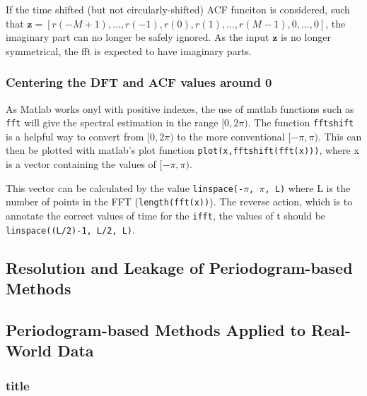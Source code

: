 \documentclass[main.tex]{subfiles}
\begin{document}
If the time shifted (but not circularly-shifted) ACF funciton is considered, such that $\textbf{z}=[r(-M+1),...,r(-1),r(0),r(1),...,r(M-1),0,...,0]$, the imaginary part can no longer be safely ignored. As the input $\textbf{z}$ is no longer 
symmetrical, the fft is expected to have imaginary parts.

\subsubsection{Centering the DFT and ACF values around 0}

As Matlab works onyl with positive indexes, the use of matlab functions such as {\tt fft} will give the spectral estimation in the range $[0,2\pi)$. The function {\tt fftshift} is a helpful way to convert from $[0,2\pi)$ to the more conventional $[-\pi,\pi)$. This can then be plotted with matlab's plot function {\tt plot(x,fftshift(fft(x)))}, where x is a vector containing the values of $[-\pi,\pi)$.

This vector can be calculated by the value {\tt linspace(-$\pi$, $\pi$, L)} where L is the number of points in the FFT ({\tt length(fft(x))}). The reverse action, which is to annotate the correct values of time for the {\tt ifft}, the values of t should be {\tt linspace((L/2)-1, L/2, L)}. %








\subsection{Resolution and Leakage of Periodogram-based Methods}











\subsection{Periodogram-based Methods Applied to Real-World Data}






\subsubsection{title}


\clearpage
\end{document}
